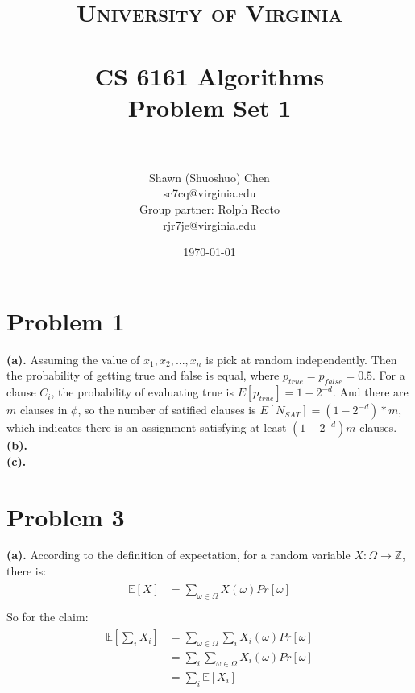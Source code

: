 \documentclass[titlepage, paper=a4, fontsize=11pt]{scrartcl} %
\title{	
\normalfont \normalsize 
\textsc{University of Virginia} \\ [25pt] %
\horrule{0.5pt} \\[0.4cm] %
\huge CS 6161 Algorithms \\
\huge Problem Set 1 \\ %
\horrule{2pt} \\[0.5cm] %
}
\author{Shawn (Shuoshuo) Chen\\sc7cq@virginia.edu\\Group partner: Rolph Recto\\ rjr7je@virginia.edu} %
\date{\normalsize\today} %
\numberwithin{equation}{section} %
\numberwithin{figure}{section} %
\numberwithin{table}{section} %
\begin{document}
\maketitle %


\section*{Problem 1}
\textbf{(a).}
Assuming the value of ${x_1,x_2, ... ,x_n}$ is pick at random independently. Then the probability of getting true
and false is equal, where $p_{true} = p_{false} = 0.5$. For a clause $C_i$, the probability of evaluating true is
$E[p_{true}] = 1-2^{-d}$. And there are $m$ clauses in $\phi$, so the number of satified clauses is
$E[N_{SAT}] = (1-2^{-d}) * m$, which indicates there is an assignment satisfying at least $(1-2^{-d})m$ clauses.
\\

\textbf{(b).}
\\

\textbf{(c).}
\\



\section*{Problem 3}
\textbf{(a).}
According to the definition of expectation, for a random variable $X: \Omega \to \mathbb{Z}$, there is:
\begin{align*} 
\begin{split}
\mathbb{E}[X] &= \sum_{\omega \in \Omega} X(\omega)Pr[\omega] \\
\end{split}					
\end{align*}
So for the claim:
\begin{align*} 
\begin{split}
\mathbb{E}[\sum_{i} X_i] &= \sum_{\omega \in \Omega} \sum_{i} X_i(\omega)Pr[\omega] \\
&= \sum_{i} \sum_{\omega \in \Omega} X_i(\omega)Pr[\omega] \\
&= \sum_{i} \mathbb{E}[X_i]
\end{split}					
\end{align*}
\\
\end{document}
